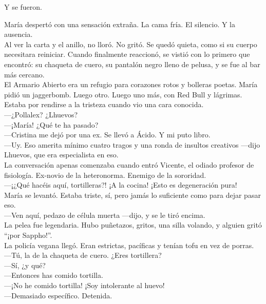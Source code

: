 Y se fueron.\\

\saltescena

María despertó con una sensación extraña. La cama fría. El silencio. Y la ausencia.\\

Al ver la carta y el anillo, no lloró. No gritó. Se quedó quieta, como si su cuerpo necesitara reiniciar. Cuando finalmente reaccionó, se vistió con lo primero que encontró: su chaqueta de cuero, su pantalón negro lleno de pelusa, y se fue al bar más cercano.\\

El Armario Abierto era un refugio para corazones rotos y bolleras poetas. María pidió un jaggerbomb. Luego otro. Luego uno más, con Red Bull y lágrimas.\\

Estaba por rendirse a la tristeza cuando vio una cara conocida.\\

—¿Pollalex? ¿Lhuevos?\\
—¡María! ¿Qué te ha pasado?\\
—Cristina me dejó por una ex. Se llevó a Ácido. Y mi puto libro.\\
—Uy. Eso amerita mínimo cuatro tragos y una ronda de insultos creativos —dijo Lhuevos, que era especialista en eso.\\

La conversación apenas comenzaba cuando entró Vicente, el odiado profesor de fisiología. Ex-novio de la heteronorma. Enemigo de la sororidad.\\

—¡¿Qué hacéis aquí, tortilleras?! ¡A la cocina! ¡Esto es degeneración pura!\\

María se levantó. Estaba triste, sí, pero jamás lo suficiente como para dejar pasar eso.\\

—Ven aquí, pedazo de célula muerta —dijo, y se le tiró encima.\\

La pelea fue legendaria. Hubo puñetazos, gritos, una silla volando, y alguien gritó “¡por Sappho!”.\\
La policía vegana llegó. Eran estrictas, pacíficas y tenían tofu en vez de porras.\\

—Tú, la de la chaqueta de cuero. ¿Eres tortillera?\\
—Sí, ¿y qué?\\
—Entonces has comido tortilla.\\
—¡No he comido tortilla! ¡Soy intolerante al huevo!\\
—Demasiado específico. Detenida.\\

